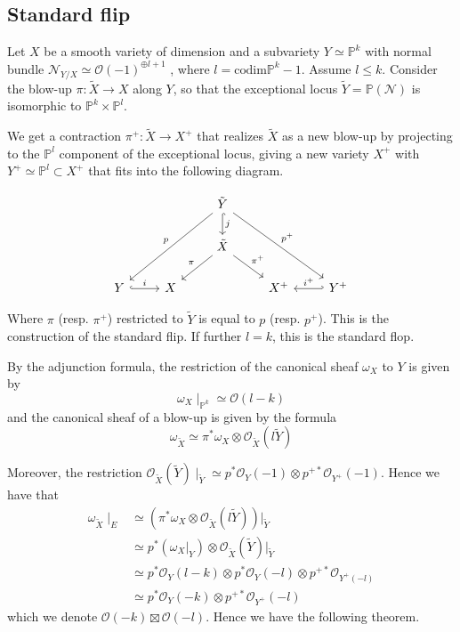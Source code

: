 \subsection{Standard flip}

Let $X$ be a smooth variety of dimension and a subvariety $Y \simeq \mathbb{P}^k$ with normal bundle $\mathcal{ N}_{Y/X}\simeq \mathcal{O}(-1)^{\oplus l+1}$ , where  $l = \mathrm{codim}\mathbb{P}^{k}-1$. Assume $l \leq k$. Consider the blow-up $\pi:\tilde{X}\to X$ along $Y$, so that the exceptional locus $\tilde{Y} = \mathbb{P}(\mathcal{N})$ is isomorphic to $\mathbb{P}^{k}\times \mathbb{P}^l$. 

We get a contraction $\pi^{+}: \tilde{X}\to X^+$ that realizes $\tilde{X}$ as a new blow-up by projecting to the $\mathbb{P}^{l}$ component of the exceptional locus, giving a new variety $X^+$ with $Y^{+}\simeq \mathbb{P}^{l}\subset X^{+}$ that fits into the following diagram. 

\[\begin{tikzcd}
	&& {\tilde Y} \\
	& {} & {\tilde X} \\
	Y & X && {X^+} & {Y^+}
	\arrow["{i^+}"', hook', from=3-5, to=3-4]
	\arrow["i", hook, from=3-1, to=3-2]
	\arrow["\pi"', from=2-3, to=3-2]
	\arrow["{\pi^+}", from=2-3, to=3-4]
	\arrow["j", hook, from=1-3, to=2-3]
	\arrow["p"', from=1-3, to=3-1]
	\arrow["{p^+}", from=1-3, to=3-5]
\end{tikzcd}\]

Where $\pi$ (resp. $\pi^+$) restricted to $\tilde{Y}$ is equal to $p$ (resp. $p^+$). This is the construction of the standard flip. If further $l = k$, this is the standard flop. 

By the adjunction formula, the restriction of the canonical sheaf $\omega_X$ to $Y$ is given by $$
\omega_{X}\mid_{\mathbb{P}^{k}} \simeq \mathcal{O}(l-k)$$ and the canonical sheaf of a blow-up is given by the formula $$\omega_{\tilde{X}} \simeq \pi^{*}\omega_{X}\otimes \mathcal{O}_{\tilde{X}}(l \tilde{Y})$$

Moreover, the restriction $\mathcal{O}_{\tilde{X}}(\tilde{Y}) \mid_{\tilde{Y}} \simeq p^{*}\mathcal{O}_{Y}(-1)\otimes p^{+*}\mathcal{O}_{Y^+}(-1)$. Hence we have that 
\begin{align*}
\omega_{\tilde{X}}\mid_{E} &\simeq \left( \pi^{*}\omega_{X}\otimes \mathcal{O}_{\tilde{X}}(l \tilde{Y}) \right) \Big|_{\tilde{Y}}  \\
&\simeq p^{*}(\omega_{X}\big|_{Y})\otimes  \mathcal{O}_{\tilde{X}}( \tilde{Y})\Big|_{\tilde{Y}}  \\
&\simeq p^{*} \mathcal{O}_Y(l-k) \otimes p^{*}\mathcal{O}_{Y}(-l) \otimes p^{+*}\mathcal{O}_{Y^{+}(-l)} \\
&\simeq p^{*} \mathcal{O}_Y(-k) \otimes p^{+*}\mathcal{O}_{Y^+}(-l) 
\end{align*}
which we denote $\mathcal{O}(-k) \boxtimes\mathcal{O}(-l)$. Hence we have the following theorem. 

